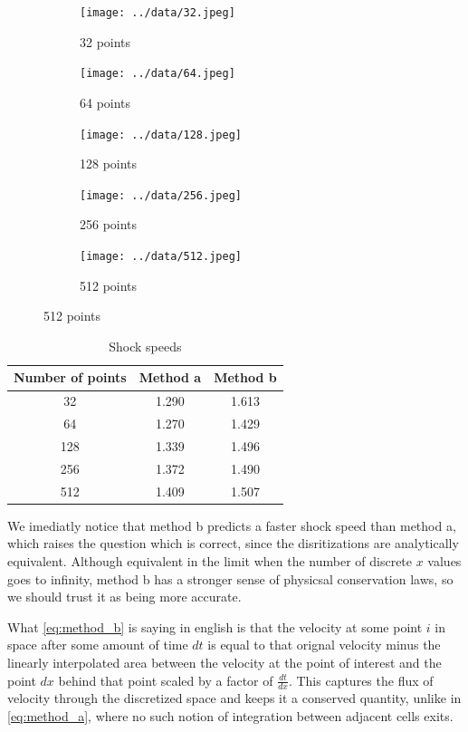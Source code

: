 \documentclass[12pt, letterpaper]{article}
\begin{document}
\begin{figure} [!b]
  \centering
  \caption{Plots at various number of points}
  \begin{subfigure}{0.3\textwidth}
    \centering
    \caption{32 points}
    \texttt{[image: ../data/32.jpeg]}
  \end{subfigure} \hfill \begin{subfigure}{0.3\textwidth}
    \centering
    \caption{64 points}
    \texttt{[image: ../data/64.jpeg]}
  \end{subfigure} \hfill \begin{subfigure}{0.3\textwidth}
    \centering
    \caption{128 points}
    \texttt{[image: ../data/128.jpeg]}
  \end{subfigure}

  \hfill \begin{subfigure}{0.3\textwidth}
    \centering
    \caption{256 points}
    \texttt{[image: ../data/256.jpeg]}
  \end{subfigure} \hfill \begin{subfigure}{0.3\textwidth}
    \centering
    \caption{512 points}
    \texttt{[image: ../data/512.jpeg]}
  \end{subfigure} \hfill
  \label{fig:plots}
\end{figure}

\begin{table}
  \centering
  \caption{Shock speeds}
  \begin{tabular}{c c c}
    \hline\hline
    Number of points & Method a & Method b \\
    \hline
    32  & 1.290 & 1.613 \\
    64  & 1.270 & 1.429 \\
    128 & 1.339 & 1.496 \\
    256 & 1.372 & 1.490 \\
    512 & 1.409 & 1.507 \\
    \hline\hline
  \end{tabular}
  \label{tab:speed}
\end{table}

We imediatly notice that method b predicts a faster shock speed than method a,
which raises the question which is correct, since the disritizations are
analytically equivalent. Although equivalent in the limit when the number of
discrete \(x\) values goes to infinity, method b has a stronger sense of
physicsal conservation laws, so we should trust it as being more accurate.

What \eqref{eq:method_b} is saying in english is that the velocity at some point
\(i\) in space after some amount of time \(dt\) is equal to that orignal
velocity minus the linearly interpolated area between the velocity at the point
of interest and the point \(dx\) behind that point scaled by a factor of
\(\frac{dt}{dx}\). This captures the flux of velocity through the discretized
space and keeps it a conserved quantity, unlike in \eqref{eq:method_a}, where no
such notion of integration between adjacent cells exits.
\end{document}
